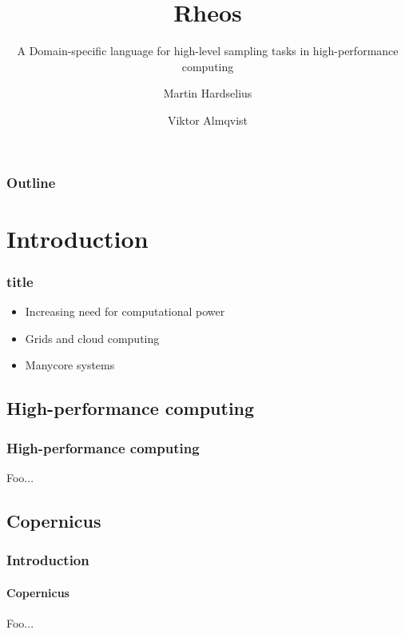 \documentclass[10pt]{beamer}
\begin{document}
\title{Rheos}
\subtitle{A Domain-specific language for high-level sampling tasks in
  high-performance computing}
\author[Hardselius \and Almqvist]{Martin Hardselius \and Viktor Almqvist}


\begin{frame}
  \titlepage
\end{frame}


\begin{frame}
\frametitle{Outline}
\pause
\tableofcontents[pausesections]
\end{frame}


\section{Introduction}
\begin{frame}
\frametitle{title}
\begin{itemize}
\item Increasing need for computational power
\pause
\item Grids and cloud computing
\pause
\item Manycore systems
\end{itemize}
\end{frame}


\subsection*{High-performance computing}
\begin{frame}
  \frametitle{High-performance computing}
  Foo...
\end{frame}


\subsection*{Copernicus}
\begin{frame}
  \frametitle{Introduction}
  \framesubtitle{Copernicus}
  Foo...
\end{frame}
\end{document}
